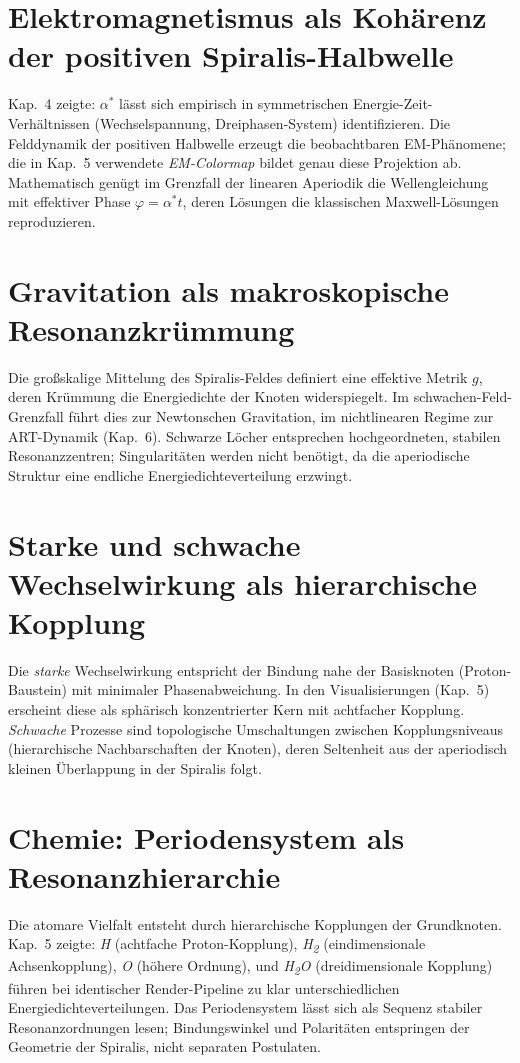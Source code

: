 \section{Elektromagnetismus als Kohärenz der positiven Spiralis-Halbwelle}
\label{sec:alpha-empirie}
Kap.~4 zeigte: \(\alpha^*\) lässt sich empirisch in symmetrischen Energie-Zeit-Verhältnissen (Wechselspannung, Dreiphasen-System) identifizieren. 
Die Felddynamik der positiven Halbwelle erzeugt die beobachtbaren EM-Phänomene; die in Kap.~5 verwendete \emph{EM-Colormap} bildet genau diese Projektion ab. 
Mathematisch genügt im Grenzfall der linearen Aperiodik die Wellengleichung mit effektiver Phase \(\varphi=\alpha^* t\), deren Lösungen die klassischen Maxwell-Lösungen reproduzieren.

\section{Gravitation als makroskopische Resonanzkrümmung}
\label{sec:gravitation}
Die großskalige Mittelung des Spiralis-Feldes definiert eine effektive Metrik \(g\), deren Krümmung die Energiedichte der Knoten widerspiegelt. 
Im schwachen-Feld-Grenzfall führt dies zur Newtonschen Gravitation, im nichtlinearen Regime zur ART-Dynamik (Kap.~6). 
Schwarze Löcher entsprechen hochgeordneten, stabilen Resonanzzentren; Singularitäten werden nicht benötigt, da die aperiodische Struktur eine endliche Energiedichteverteilung erzwingt.

\section{Starke und schwache Wechselwirkung als hierarchische Kopplung}
\label{sec:stark-schwach}
Die \emph{starke} Wechselwirkung entspricht der Bindung nahe der Basisknoten (Proton-Baustein) mit minimaler Phasenabweichung. 
In den Visualisierungen (Kap.~5) erscheint diese als sphärisch konzentrierter Kern mit achtfacher Kopplung.
\emph{Schwache} Prozesse sind topologische Umschaltungen zwischen Kopplungsniveaus (hierarchische Nachbarschaften der Knoten), 
deren Seltenheit aus der aperiodisch kleinen Überlappung in der Spiralis folgt.

\section{Chemie: Periodensystem als Resonanzhierarchie}
\label{sec:chemie}
Die atomare Vielfalt entsteht durch hierarchische Kopplungen der Grundknoten. 
Kap.~5 zeigte: \textit{H} (achtfache Proton-Kopplung), \textit{H\textsubscript{2}} (eindimensionale Achsenkopplung), \textit{O} (höhere Ordnung), 
und \textit{H\textsubscript{2}O} (dreidimensionale Kopplung) führen bei identischer Render-Pipeline zu klar unterschiedlichen Energiedichteverteilungen.
Das Periodensystem lässt sich als Sequenz stabiler Resonanzordnungen lesen; Bindungswinkel und Polaritäten entspringen der Geometrie der Spiralis, nicht separaten Postulaten.

